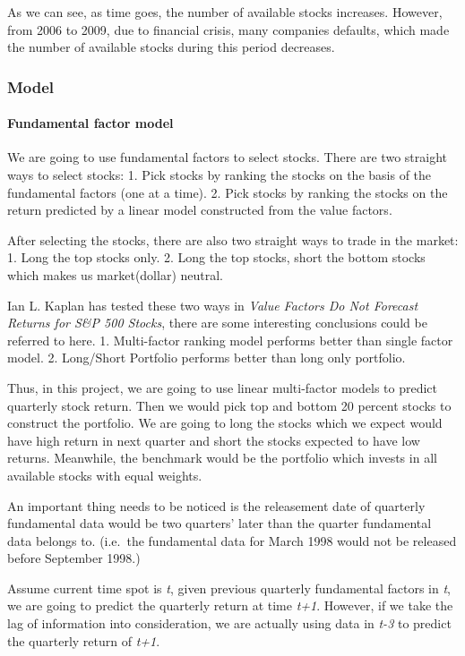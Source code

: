 \documentclass[]{article}
\let\oldparagraph\paragraph
\renewcommand{\paragraph}[1]{\oldparagraph{#1}\mbox{}}
\begin{document}
As we can see, as time goes, the number of available stocks increases.
However, from 2006 to 2009, due to financial crisis, many companies
defaults, which made the number of available stocks during this period
decreases.

\hypertarget{model}{%
\subsubsection{Model}\label{model}}

\hypertarget{fundamental-factor-model}{%
\paragraph{Fundamental factor model}\label{fundamental-factor-model}}

We are going to use fundamental factors to select stocks. There are two
straight ways to select stocks: 1. Pick stocks by ranking the stocks on
the basis of the fundamental factors (one at a time). 2. Pick stocks by
ranking the stocks on the return predicted by a linear model constructed
from the value factors.

After selecting the stocks, there are also two straight ways to trade in
the market: 1. Long the top stocks only. 2. Long the top stocks, short
the bottom stocks which makes us market(dollar) neutral.

Ian L. Kaplan has tested these two ways in \emph{Value Factors Do Not
Forecast Returns for S\&P 500 Stocks}, there are some interesting
conclusions could be referred to here. 1. Multi-factor ranking model
performs better than single factor model. 2. Long/Short Portfolio
performs better than long only portfolio.

Thus, in this project, we are going to use linear multi-factor models to
predict quarterly stock return. Then we would pick top and bottom 20
percent stocks to construct the portfolio. We are going to long the
stocks which we expect would have high return in next quarter and short
the stocks expected to have low returns. Meanwhile, the benchmark would
be the portfolio which invests in all available stocks with equal
weights.

An important thing needs to be noticed is the releasement date of
quarterly fundamental data would be two quarters' later than the quarter
fundamental data belongs to. (i.e.~the fundamental data for March 1998
would not be released before September 1998.)

Assume current time spot is \emph{t}, given previous quarterly
fundamental factors in \emph{t}, we are going to predict the quarterly
return at time \emph{t+1}. However, if we take the lag of information
into consideration, we are actually using data in \emph{t-3} to predict
the quarterly return of \emph{t+1}.
\end{document}
